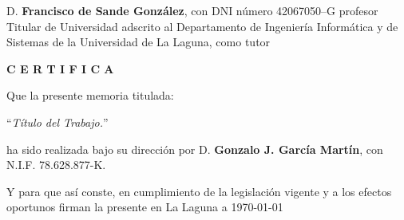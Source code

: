 %
%
%
%

\newpage
\thispagestyle{empty}

D. {\bf Francisco de Sande González}, con DNI número 42067050--G
profesor Titular de Universidad adscrito al Departamento de Ingeniería Informática y de Sistemas
de la Universidad de La Laguna, como tutor

\bigskip
\bigskip
{\bf C E R T I F I C A}

\bigskip
\bigskip
\bigskip
Que la presente memoria titulada:

\bigskip
``{\it Título del Trabajo.}''

\bigskip
\bigskip
\bigskip

\noindent ha sido realizada bajo su dirección por D. {\bf Gonzalo J. García Martín},
con N.I.F. 78.628.877-K.

\bigskip
\bigskip

Y para que así conste, en cumplimiento de la legislación vigente y a los efectos
oportunos firman la presente en La Laguna a \today

